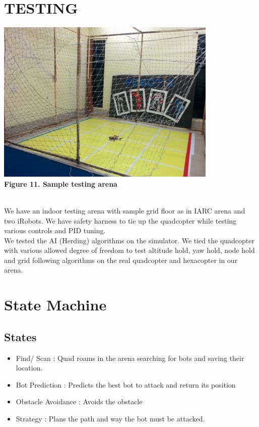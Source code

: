 \documentclass[12pt]{article}
\begin{document}
\section{TESTING}
\begin{center}\includegraphics[scale=0.7]{ARK-lab-kgp1} \\
\textbf{Figure 11. Sample testing arena}\end{center}\\
We have an indoor testing arena with sample grid floor as in IARC arena and two iRobots. We have safety harness to 
tie up the quadcopter while testing various controls and PID tuning. \\
We tested the AI (Herding) algorithms on the simulator. We tied the quadcopter with various allowed degree of 
freedom to test altitude hold, yaw hold, node hold and grid following algorithms on the real quadcopter and hexacopter in our arena.
\section{State Machine}
\subsection{States}
\begin{itemize}
\item {Find/ Scan : Quad roams in the arena searching for bots and saving their location.}
\item{Bot Prediction : Predicts the best bot to attack and return its position}
\item{Obstacle Avoidance : Avoids the obstacle}
\item{Strategy : Plans the path and way the bot must be attacked.}
\end{itemize}
\end{document}
